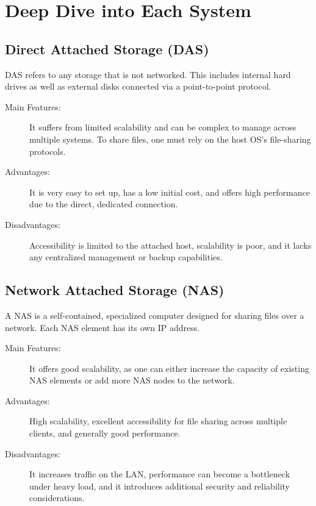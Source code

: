 \section{Deep Dive into Each System}

\subsection{Direct Attached Storage (DAS)}
DAS refers to any storage that is not networked. This includes internal hard drives as well as external disks connected via a point-to-point protocol.
\begin{description}
    \item[Main Features:] It suffers from limited scalability and can be complex to manage across multiple systems. To share files, one must rely on the host OS's file-sharing protocols.
    \item[Advantages:] It is very easy to set up, has a low initial cost, and offers high performance due to the direct, dedicated connection.
    \item[Disadvantages:] Accessibility is limited to the attached host, scalability is poor, and it lacks any centralized management or backup capabilities.
\end{description}

\subsection{Network Attached Storage (NAS)}
A NAS is a self-contained, specialized computer designed for sharing files over a network. Each NAS element has its own IP address.
\begin{description}
    \item[Main Features:] It offers good scalability, as one can either increase the capacity of existing NAS elements or add more NAS nodes to the network.
    \item[Advantages:] High scalability, excellent accessibility for file sharing across multiple clients, and generally good performance.
    \item[Disadvantages:] It increases traffic on the LAN, performance can become a bottleneck under heavy load, and it introduces additional security and reliability considerations.
\end{description}

